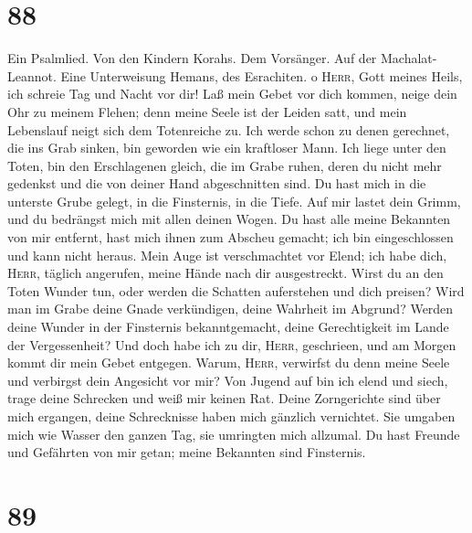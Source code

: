 \hypertarget{section-87}{%
\section{88}\label{section-87}}

 Ein Psalmlied. Von den Kindern Korahs. Dem Vorsänger. Auf
der Machalat-Leannot. Eine Unterweisung Hemans, des Esrachiten. o
\textsc{Herr}, Gott meines Heils, ich schreie Tag und Nacht vor dir!
 Laß mein Gebet vor dich kommen, neige dein Ohr zu meinem
Flehen;  denn meine Seele ist der Leiden satt, und mein
Lebenslauf neigt sich dem Totenreiche zu.  Ich werde schon
zu denen gerechnet, die ins Grab sinken, bin geworden wie ein kraftloser
Mann.  Ich liege unter den Toten, bin den Erschlagenen
gleich, die im Grabe ruhen, deren du nicht mehr gedenkst und die von
deiner Hand abgeschnitten sind.  Du hast mich in die
unterste Grube gelegt, in die Finsternis, in die Tiefe. 
Auf mir lastet dein Grimm, und du bedrängst mich mit allen deinen Wogen.
 Du hast alle meine Bekannten von mir entfernt, hast mich
ihnen zum Abscheu gemacht; ich bin eingeschlossen und kann nicht heraus.
 Mein Auge ist verschmachtet vor Elend; ich habe dich,
\textsc{Herr}, täglich angerufen, meine Hände nach dir ausgestreckt.
 Wirst du an den Toten Wunder tun, oder werden die
Schatten auferstehen und dich preisen?  Wird man im Grabe
deine Gnade verkündigen, deine Wahrheit im Abgrund? 
Werden deine Wunder in der Finsternis bekanntgemacht, deine
Gerechtigkeit im Lande der Vergessenheit?  Und doch habe
ich zu dir, \textsc{Herr}, geschrieen, und am Morgen kommt dir mein
Gebet entgegen.  Warum, \textsc{Herr}, verwirfst du denn
meine Seele und verbirgst dein Angesicht vor mir?  Von
Jugend auf bin ich elend und siech, trage deine Schrecken und weiß mir
keinen Rat.  Deine Zorngerichte sind über mich ergangen,
deine Schrecknisse haben mich gänzlich vernichtet.  Sie
umgaben mich wie Wasser den ganzen Tag, sie umringten mich allzumal.
 Du hast Freunde und Gefährten von mir getan; meine
Bekannten sind Finsternis.

\hypertarget{section-88}{%
\section{89}\label{section-88}}

